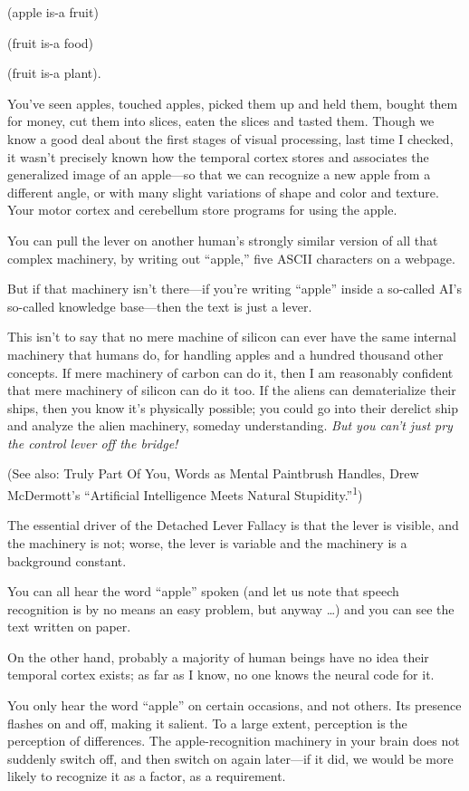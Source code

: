 {
 (apple is-a fruit)}

{
 (fruit is-a food)}

{
 (fruit is-a plant).}

{
 You've seen apples, touched apples, picked them up
and held them, bought them for money, cut them into slices, eaten the
slices and tasted them. Though we know a good deal about the first
stages of visual processing, last time I checked, it
wasn't precisely known how the temporal cortex stores
and associates the generalized image of an apple---so that we can
recognize a new apple from a different angle, or with many slight
variations of shape and color and texture. Your motor cortex and
cerebellum store programs for using the apple.}

{
 You can pull the lever on another human's strongly
similar version of all that complex machinery, by writing out
``apple,'' five ASCII characters on
a webpage.}

{
 But if that machinery isn't there---if
you're writing
``apple'' inside a so-called
AI's so-called knowledge base---then the text is just a
lever.}

{
 This isn't to say that no mere machine of silicon
can ever have the same internal machinery that humans do, for handling
apples and a hundred thousand other concepts. If mere machinery of
carbon can do it, then I am reasonably confident that mere machinery of
silicon can do it too. If the aliens can dematerialize their ships,
then you know it's physically possible; you could go
into their derelict ship and analyze the alien machinery, someday
understanding. \textit{But you can't just pry the
control lever off the bridge!}}

{
 (See also: Truly Part Of You, Words as Mental Paintbrush Handles,
Drew McDermott's ``Artificial
Intelligence Meets Natural
Stupidity.''\textsuperscript{1})}

{
 The essential driver of the Detached Lever Fallacy is that the
lever is visible, and the machinery is not; worse, the lever is
variable and the machinery is a background constant.}

{
 You can all hear the word
``apple'' spoken (and let us note
that speech recognition is by no means an easy problem, but anyway
\ldots) and you can see the text written on paper.}

{
 On the other hand, probably a majority of human beings have no
idea their temporal cortex exists; as far as I know, no one knows the
neural code for it.}

{
 You only hear the word
``apple'' on certain occasions, and
not others. Its presence flashes on and off, making it salient. To a
large extent, perception is the perception of differences. The
apple-recognition machinery in your brain does not suddenly switch off,
and then switch on again later---if it did, we would be more likely to
recognize it as a factor, as a requirement.}

